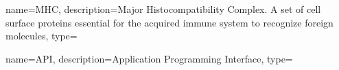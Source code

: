 {
    name={MHC},
    description={Major Histocompatibility Complex. A set of cell surface proteins essential for the acquired immune system to recognize foreign molecules},
    type=\acronymtype
}


\glsaddall
\printglossary[type=\acronymtype, title=Liste des abréviations, toctitle=Liste des abréviations]
{
    name={API},
    description={Application Programming Interface},
    type=\acronymtype
}
